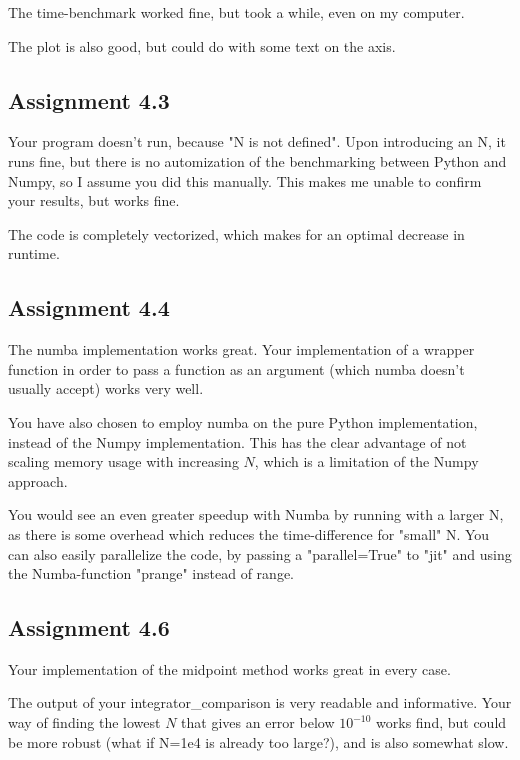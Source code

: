 \documentclass[12p,a4paper]{article}
\begin{document}
The time-benchmark worked fine, but took a while, even on my computer.

The plot is also good, but could do with some text on the axis.



\subsection*{Assignment 4.3}
Your program doesn't run, because "N is not defined". Upon introducing an N, it runs fine, but there is no automization of the benchmarking between Python and Numpy, so I assume you did this manually. This makes me unable to confirm your results, but works fine.

The code is completely vectorized, which makes for an optimal decrease in runtime.


\subsection*{Assignment 4.4}
The numba implementation works great. Your implementation of a wrapper function in order to pass a function as an argument (which numba doesn't usually accept) works very well.

You have also chosen to employ numba on the pure Python implementation, instead of the Numpy implementation. This has the clear advantage of not scaling memory usage with increasing $N$, which is a limitation of the Numpy approach.

You would see an even greater speedup with Numba by running with a larger N, as there is some overhead which reduces the time-difference for "small" N. You can also easily parallelize the code, by passing a "parallel=True" to "jit" and using the Numba-function "prange" instead of range.


\subsection*{Assignment 4.6}
Your implementation of the midpoint method works great in every case.

The output of your integrator\_comparison is very readable and informative. Your way of finding the lowest $N$ that gives an error below $10^{-10}$ works find, but could be more robust (what if N=1e4 is already too large?), and is also somewhat slow.
\end{document}
